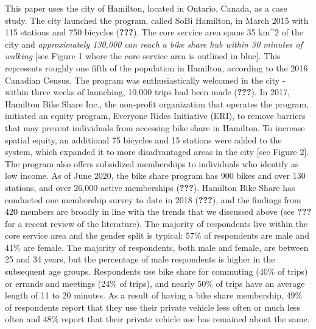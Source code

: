 \documentclass[]{elsarticle} %
\begin{document}
This paper uses the city of Hamilton, located in Ontario, Canada, as a
case study. The city launched the program, called SoBi Hamilton, in
March 2015 with 115 stations and 750 bicycles ({\textbf{???}}). The core
service area spans 35 km\^{}2 of the city and \emph{approximately
130,000 can reach a bike share hub within 30 minutes of walking} {[}see
Figure 1 where the core service area is outlined in blue{]}. This
represents roughly one fifth of the population in Hamilton, according to
the 2016 Canadian Census. The program was enthusiastically welcomed in
the city - within three weeks of launching, 10,000 trips had been made
({\textbf{???}}). In 2017, Hamilton Bike Share Inc., the non-profit
organization that operates the program, initiated an equity program,
Everyone Rides Initiative (ERI), to remove barriers that may prevent
individuals from accessing bike share in Hamilton. To increase spatial
equity, an additional 75 bicycles and 15 stations were added to the
system, which expanded it to more disadvantaged areas in the city {[}see
Figure 2{]}. The program also offers subsidized memberships to
individuals who identify as low income. As of June 2020, the bike share
program has 900 bikes and over 130 stations, and over 26,000 active
memberships ({\textbf{???}}). Hamilton Bike Share has conducted one
membership survey to date in 2018 ({\textbf{???}}), and the findings
from 420 members are broadly in line with the trends that we discussed
above (see {\textbf{???}} for a recent review of the literature). The
majority of respondents live within the core service area and the gender
split is typical: 57\% of respondents are male and 41\% are female. The
majority of respondents, both male and female, are between 25 and 34
years, but the percentage of male respondents is higher in the
subsequent age groups. Respondents use bike share for commuting (40\% of
trips) or errands and meetings (24\% of trips), and nearly 50\% of trips
have an average length of 11 to 20 minutes. As a result of having a bike
share membership, 49\% of respondents report that they use their private
vehicle less often or much less often and 48\% report that their private
vehicle use has remained about the same.
\end{document}
